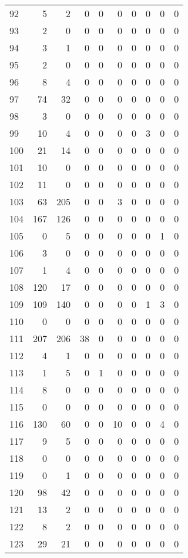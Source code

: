 \begin{tabular}{lrrrrrrrrr}
92 & 5 & 2 & 0 & 0 & 0 & 0 & 0 & 0 & 0 \\
93 & 2 & 0 & 0 & 0 & 0 & 0 & 0 & 0 & 0 \\
94 & 3 & 1 & 0 & 0 & 0 & 0 & 0 & 0 & 0 \\
95 & 2 & 0 & 0 & 0 & 0 & 0 & 0 & 0 & 0 \\
96 & 8 & 4 & 0 & 0 & 0 & 0 & 0 & 0 & 0 \\
97 & 74 & 32 & 0 & 0 & 0 & 0 & 0 & 0 & 0 \\
98 & 3 & 0 & 0 & 0 & 0 & 0 & 0 & 0 & 0 \\
99 & 10 & 4 & 0 & 0 & 0 & 0 & 3 & 0 & 0 \\
100 & 21 & 14 & 0 & 0 & 0 & 0 & 0 & 0 & 0 \\
101 & 10 & 0 & 0 & 0 & 0 & 0 & 0 & 0 & 0 \\
102 & 11 & 0 & 0 & 0 & 0 & 0 & 0 & 0 & 0 \\
103 & 63 & 205 & 0 & 0 & 3 & 0 & 0 & 0 & 0 \\
104 & 167 & 126 & 0 & 0 & 0 & 0 & 0 & 0 & 0 \\
105 & 0 & 5 & 0 & 0 & 0 & 0 & 0 & 1 & 0 \\
106 & 3 & 0 & 0 & 0 & 0 & 0 & 0 & 0 & 0 \\
107 & 1 & 4 & 0 & 0 & 0 & 0 & 0 & 0 & 0 \\
108 & 120 & 17 & 0 & 0 & 0 & 0 & 0 & 0 & 0 \\
109 & 109 & 140 & 0 & 0 & 0 & 0 & 1 & 3 & 0 \\
110 & 0 & 0 & 0 & 0 & 0 & 0 & 0 & 0 & 0 \\
111 & 207 & 206 & 38 & 0 & 0 & 0 & 0 & 0 & 0 \\
112 & 4 & 1 & 0 & 0 & 0 & 0 & 0 & 0 & 0 \\
113 & 1 & 5 & 0 & 1 & 0 & 0 & 0 & 0 & 0 \\
114 & 8 & 0 & 0 & 0 & 0 & 0 & 0 & 0 & 0 \\
115 & 0 & 0 & 0 & 0 & 0 & 0 & 0 & 0 & 0 \\
116 & 130 & 60 & 0 & 0 & 10 & 0 & 0 & 4 & 0 \\
117 & 9 & 5 & 0 & 0 & 0 & 0 & 0 & 0 & 0 \\
118 & 0 & 0 & 0 & 0 & 0 & 0 & 0 & 0 & 0 \\
119 & 0 & 1 & 0 & 0 & 0 & 0 & 0 & 0 & 0 \\
120 & 98 & 42 & 0 & 0 & 0 & 0 & 0 & 0 & 0 \\
121 & 13 & 2 & 0 & 0 & 0 & 0 & 0 & 0 & 0 \\
122 & 8 & 2 & 0 & 0 & 0 & 0 & 0 & 0 & 0 \\
123 & 29 & 21 & 0 & 0 & 0 & 0 & 0 & 0 & 0 \\

\end{tabular}
